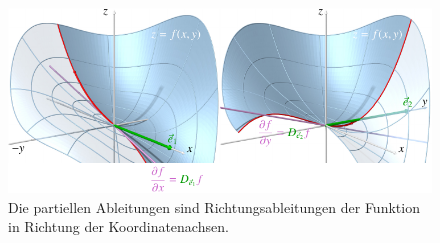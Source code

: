 %
%
%
\begin{figure}
\centering
\includegraphics{chapters/010-fuvar/images/fxy.pdf}
\caption{Die partiellen Ableitungen sind Richtungsableitungen der
Funktion in Richtung der Koordinatenachsen.
\label{buch:fuvar:richtungsableitung:fig:partrichtung}}
\end{figure}
